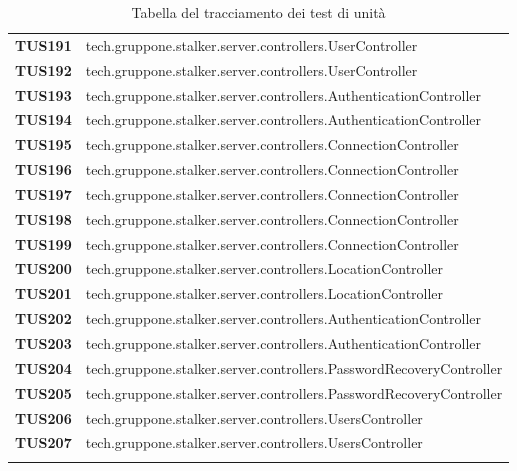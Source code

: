 \documentclass[../../piano-di-qualifica.tex]{subfiles}
\begin{document}
\begin{longtable}[H]{>{\centering\bfseries}m{3cm} >{}m{13cm}}
  TUS191 & tech.gruppone.stalker.server.controllers.UserController \\
  TUS192 & tech.gruppone.stalker.server.controllers.UserController \\
  TUS193 & tech.gruppone.stalker.server.controllers.AuthenticationController \\
  TUS194 & tech.gruppone.stalker.server.controllers.AuthenticationController \\
  TUS195 & tech.gruppone.stalker.server.controllers.ConnectionController \\
  TUS196 & tech.gruppone.stalker.server.controllers.ConnectionController \\
  TUS197 & tech.gruppone.stalker.server.controllers.ConnectionController \\
  TUS198 & tech.gruppone.stalker.server.controllers.ConnectionController \\
  TUS199 & tech.gruppone.stalker.server.controllers.ConnectionController \\
  TUS200 & tech.gruppone.stalker.server.controllers.LocationController \\
  TUS201 & tech.gruppone.stalker.server.controllers.LocationController \\
  TUS202 & tech.gruppone.stalker.server.controllers.AuthenticationController \\
  TUS203 & tech.gruppone.stalker.server.controllers.AuthenticationController \\
  TUS204 & tech.gruppone.stalker.server.controllers.PasswordRecoveryController \\
  TUS205 & tech.gruppone.stalker.server.controllers.PasswordRecoveryController \\
  TUS206 & tech.gruppone.stalker.server.controllers.UsersController \\
  TUS207 & tech.gruppone.stalker.server.controllers.UsersController \\

  \rowcolor{white}
  \caption{Tabella del tracciamento dei test di unità}%
  \label{tab:tabella_tracciamento_test_di_unita}
\end{longtable}


\end{document}
